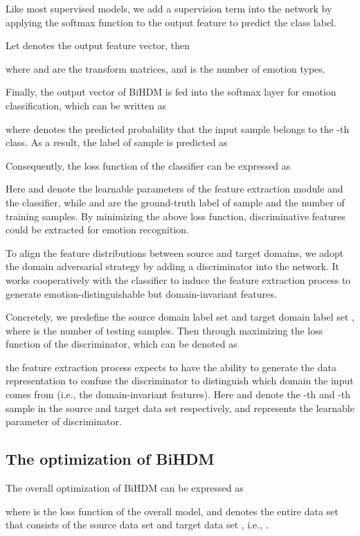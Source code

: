 \documentclass[journal]{IEEEtran}
\begin{document}
Like most supervised models, we add a supervision term into the network by applying the softmax function to the output feature  to predict the class label.

Let  denotes the output feature vector, then 
  
where  and  are the transform matrices, and  is the number of emotion types.

Finally, the output vector of BiHDM is fed into the softmax layer for emotion classification, which can be written as
  
where  denotes the predicted probability that the input sample  belongs to the -th class. As a result, the label  of sample  is predicted as 
  

Consequently, the loss function of the classifier can be expressed as

\vspace{-0.25cm}

Here  and  denote the learnable parameters of the feature extraction module and the classifier, while  and  are the ground-truth label of sample  and the number of training samples. By minimizing the above loss function, discriminative features could be extracted for emotion recognition.

To align the feature distributions between source and target domains, we adopt the domain adversarial strategy by adding a discriminator into the network. It works cooperatively with the classifier to induce the feature extraction process to generate emotion-distinguishable but domain-invariant features.

Concretely, we predefine the source domain label set  and target domain label set , where  is the number of testing samples. Then through maximizing the loss function of the discriminator, which can be denoted as

the feature extraction process expects to have the ability to generate the data representation to confuse the discriminator to distinguish which domain the input comes from (i.e., the domain-invariant features). Here  and  denote the -th and -th sample in the source and target data set respectively, and  represents the learnable parameter of discriminator. 

\subsection{The optimization of BiHDM}
The overall optimization of BiHDM can be expressed as

where  is the loss function of the overall model, and  denotes the entire data set that consists of the source data set  and target data set , i.e., .
\end{document}
